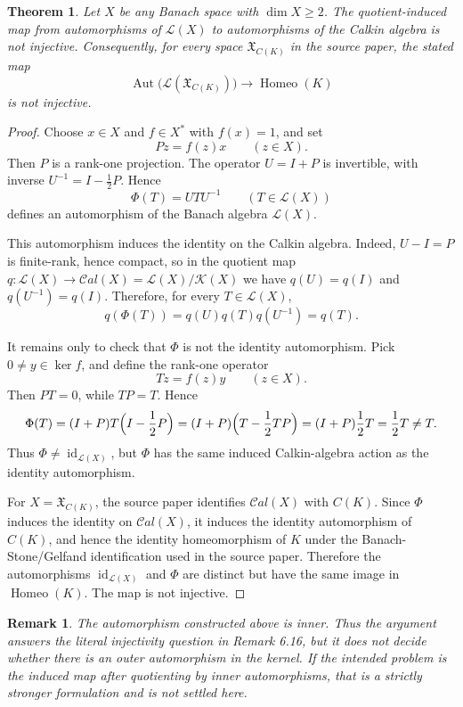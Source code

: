 \documentclass[11pt]{article}
\newtheorem*{theorem}{Theorem}
\newtheorem*{remark}{Remark}
\newcommand{\Cal}{\mathcal{C}al}
\newcommand{\K}{\mathcal{K}}
\newcommand{\Lop}{\mathcal{L}}
\newcommand{\Homeo}{\operatorname{Homeo}}
\begin{document}
\begin{theorem}
Let \(X\) be any Banach space with \(\dim X\geq 2\).  The quotient-induced
map from automorphisms of \(\Lop(X)\) to automorphisms of the Calkin
algebra is not injective.  Consequently, for every space
\(\mathfrak X_{C(K)}\) in the source paper, the stated map
\[
    \operatorname{Aut}\bigl(\Lop(\mathfrak X_{C(K)})\bigr)
    \longrightarrow \Homeo(K)
\]
is not injective.
\end{theorem}

\begin{proof}
Choose \(x\in X\) and \(f\in X^*\) with \(f(x)=1\), and set
\[
    Pz=f(z)x \qquad (z\in X).
\]
Then \(P\) is a rank-one projection.  The operator \(U=I+P\) is invertible,
with inverse \(U^{-1}=I-\frac12P\).  Hence
\[
    \Phi(T)=UTU^{-1} \qquad (T\in\Lop(X))
\]
defines an automorphism of the Banach algebra \(\Lop(X)\).

This automorphism induces the identity on the Calkin algebra.  Indeed,
\(U-I=P\) is finite-rank, hence compact, so in the quotient map
\(q:\Lop(X)\to \Cal(X)=\Lop(X)/\K(X)\) we have \(q(U)=q(I)\) and
\(q(U^{-1})=q(I)\).  Therefore, for every \(T\in \Lop(X)\),
\[
    q(\Phi(T))=q(U)q(T)q(U^{-1})=q(T).
\]

It remains only to check that \(\Phi\) is not the identity automorphism.
Pick \(0\neq y\in \ker f\), and define the rank-one operator
\[
    Tz=f(z)y \qquad (z\in X).
\]
Then \(PT=0\), while \(TP=T\).  Hence
\[
    \Phi(T)=(I+P)T\Bigl(I-\frac12P\Bigr)
    =(I+P)\Bigl(T-\frac12TP\Bigr)
    =(I+P)\frac12T
    =\frac12T\neq T.
\]
Thus \(\Phi\neq \operatorname{id}_{\Lop(X)}\), but \(\Phi\) has the same
induced Calkin-algebra action as the identity automorphism.

For \(X=\mathfrak X_{C(K)}\), the source paper identifies
\(\Cal(X)\) with \(C(K)\).  Since \(\Phi\) induces the identity on
\(\Cal(X)\), it induces the identity automorphism of \(C(K)\), and hence
the identity homeomorphism of \(K\) under the Banach-Stone/Gelfand
identification used in the source paper.  Therefore the automorphisms
\(\operatorname{id}_{\Lop(X)}\) and \(\Phi\) are distinct but have the
same image in \(\Homeo(K)\).  The map is not injective.
\end{proof}

\begin{remark}
The automorphism constructed above is inner.  Thus the argument answers
the literal injectivity question in Remark 6.16, but it does not decide
whether there is an outer automorphism in the kernel.  If the intended
problem is the induced map after quotienting by inner automorphisms, that
is a strictly stronger formulation and is not settled here.
\end{remark}
\end{document}
